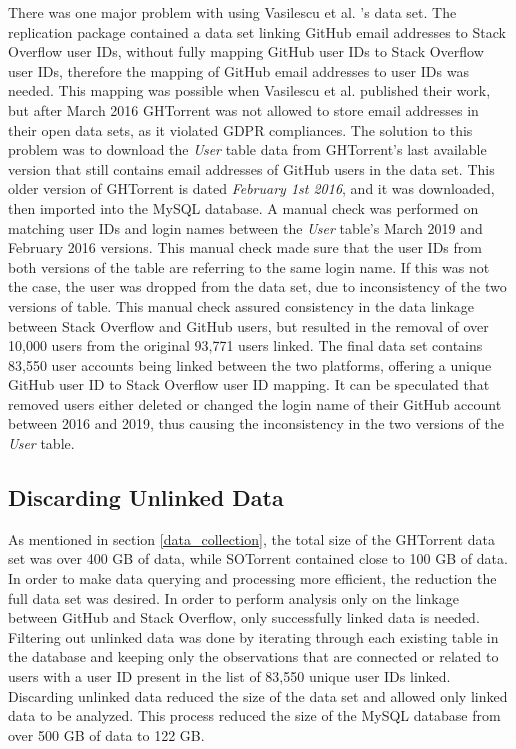         There was one major problem with using Vasilescu et al. \cite{vasilescu2013stackoverflow}'s data set. The replication package contained a data set linking GitHub email addresses to Stack Overflow user IDs, without fully mapping GitHub user IDs to Stack Overflow user IDs, therefore the mapping of GitHub email addresses to user IDs was needed. This mapping was possible when Vasilescu et al. \cite{vasilescu2013stackoverflow} published their work, but after March 2016 GHTorrent was not allowed to store email addresses in their open data sets, as it violated GDPR compliances. The solution to this problem was to download the \textit{User} table data from GHTorrent's last available version that still contains email addresses of GitHub users in the data set. This older version of GHTorrent is dated \textit{February 1st 2016}, and it was downloaded, then imported into the MySQL database. A manual check was performed on matching user IDs and login names between the \textit{User} table's March 2019 and February 2016 versions. This manual check made sure that the user IDs from both versions of the table are referring to the same login name. If this was not the case, the user was dropped from the data set, due to inconsistency of the two versions of table. This manual check assured consistency in the data linkage between Stack Overflow and GitHub users, but resulted in the removal of over 10,000 users from the original 93,771 users linked. The final data set contains 83,550 user accounts being linked between the two platforms, offering a unique GitHub user ID to Stack Overflow user ID mapping. It can be speculated that removed users either deleted or changed the login name of their GitHub account between 2016 and 2019, thus causing the inconsistency in the two versions of the \textit{User} table.
        
    \subsection{Discarding Unlinked Data}
    
       As mentioned in section \ref{data_collection}, the total size of the GHTorrent data set was over 400 GB of data, while SOTorrent contained close to 100 GB of data. In order to make data querying and processing more efficient, the reduction the full data set was desired. In order to perform analysis only on the linkage between GitHub and Stack Overflow, only successfully linked data is needed. Filtering out unlinked data was done by iterating through each existing table in the database and keeping only the observations that are connected or related to users with a user ID present in the list of 83,550 unique user IDs linked. Discarding unlinked data reduced the size of the data set and allowed only linked data to be analyzed. This process reduced the size of the MySQL database from over 500 GB of data to 122 GB.
        
